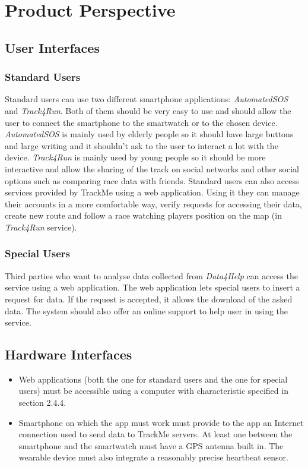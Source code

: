\section{Product Perspective}

\subsection{User Interfaces}

\subsubsection{Standard Users}
Standard users can use two different smartphone applications: \textit{AutomatedSOS} and \textit{Track4Run}.
Both of them should be very easy to use and should allow the user to connect the smartphone to the smartwatch or to the chosen device.
\textit{AutomatedSOS} is mainly used by elderly people so it should have large buttons and large writing and it shouldn't ask to the user to interact a lot with the device.
\textit{Track4Run} is mainly used by young people so it should be more interactive and allow the sharing of the track on social networks and other social options such as comparing race data with friends.
Standard users can also access services provided by TrackMe using a web application. Using it they can manage their accounts in a more comfortable way, verify requests for accessing their data, create new route and follow a race watching players position on the map (in \textit{Track4Run} service).

\subsubsection{Special Users}
Third parties who want to analyse data collected from \textit{Data4Help} can access the service using a web application.
The web application lets special users to insert a request for data.
If the request is accepted, it allows the download of the asked data.
The system should also offer an online support to help user in using the service.

\subsection{Hardware Interfaces}
\begin{itemize}
\item Web applications (both the one for standard users and the one for special users) must be accessible using a computer with characteristic specified in section 2.4.4.
\item Smartphone on which the app must work must provide to the app an Internet connection used to send data to TrackMe servers.
At least one between the smartphone and the smartwatch must have a GPS antenna built in.
The wearable device must also integrate a reasonably precise heartbeat sensor.
\end{itemize}

